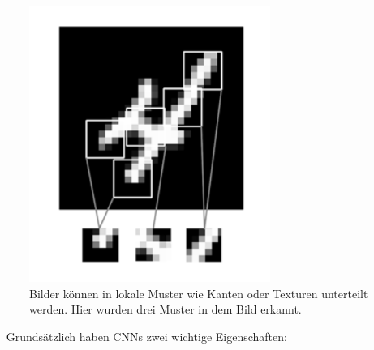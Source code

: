 \begin{figure}[h!]
	\centering
	\includegraphics[width=0.7\textwidth]{bilder/convolution_example.PNG}
	\caption{Bilder können in lokale Muster wie Kanten oder Texturen unterteilt werden. Hier wurden drei Muster in dem Bild erkannt\cite{francois}.}
	\label{convolution_example}
\end{figure}

\newpage
~\newline
Grundsätzlich haben CNNs zwei wichtige Eigenschaften\cite{francois}:

